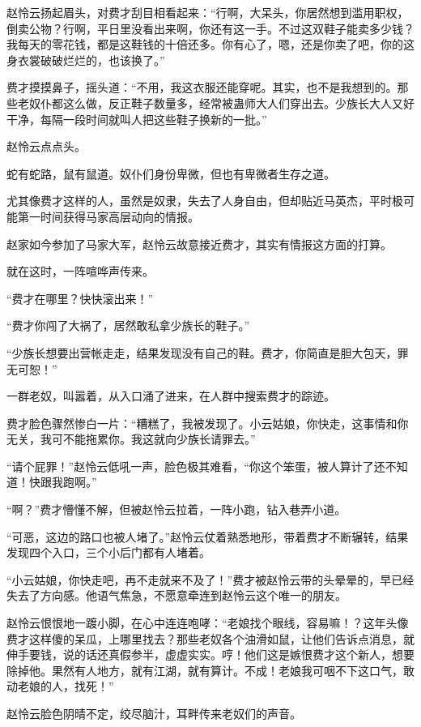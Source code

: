 \begin{this_body}
赵怜云扬起眉头，对费才刮目相看起来：“行啊，大呆头，你居然想到滥用职权，倒卖公物？行啊，平日里没看出来啊，你还有这一手。不过这双鞋子能卖多少钱？我每天的零花钱，都是这鞋钱的十倍还多。你有心了，嗯，还是你卖了吧，你的这身衣裳破破烂烂的，也该换了。”

费才摸摸鼻子，摇头道：“不用，我这衣服还能穿呢。其实，也不是我想到的。那些老奴仆都这么做，反正鞋子数量多，经常被蛊师大人们穿出去。少族长大人又好干净，每隔一段时间就叫人把这些鞋子换新的一批。”

赵怜云点点头。

蛇有蛇路，鼠有鼠道。奴仆们身份卑微，但也有卑微者生存之道。

尤其像费才这样的人，虽然是奴隶，失去了人身自由，但却贴近马英杰，平时极可能第一时间获得马家高层动向的情报。

赵家如今参加了马家大军，赵怜云故意接近费才，其实有情报这方面的打算。

就在这时，一阵喧哗声传来。

“费才在哪里？快快滚出来！”

“费才你闯了大祸了，居然敢私拿少族长的鞋子。”

“少族长想要出营帐走走，结果发现没有自己的鞋。费才，你简直是胆大包天，罪无可恕！”

一群老奴，叫嚣着，从入口涌了进来，在人群中搜索费才的踪迹。

费才脸色骤然惨白一片：“糟糕了，我被发现了。小云姑娘，你快走，这事情和你无关，我可不能拖累你。我这就向少族长请罪去。”

“请个屁罪！”赵怜云低吼一声，脸色极其难看，“你这个笨蛋，被人算计了还不知道！快跟我跑啊。”

“啊？”费才懵懂不解，但被赵怜云拉着，一阵小跑，钻入巷弄小道。

“可恶，这边的路口也被人堵了。”赵怜云仗着熟悉地形，带着费才不断辗转，结果发现四个入口，三个小后门都有人堵着。

“小云姑娘，你快走吧，再不走就来不及了！”费才被赵怜云带的头晕晕的，早已经失去了方向感。他语气焦急，不愿意牵连到赵怜云这个唯一的朋友。

赵怜云恨恨地一踱小脚，在心中连连咆哮：“老娘找个眼线，容易嘛！？这年头像费才这样傻的呆瓜，上哪里找去？那些老奴各个油滑如鼠，让他们告诉点消息，就伸手要钱，说的话还真假参半，虚虚实实。哼！他们这是嫉恨费才这个新人，想要除掉他。果然有人地方，就有江湖，就有算计。不成！老娘我可咽不下这口气，敢动老娘的人，找死！”

赵怜云脸色阴晴不定，绞尽脑汁，耳畔传来老奴们的声音。


\end{this_body}

